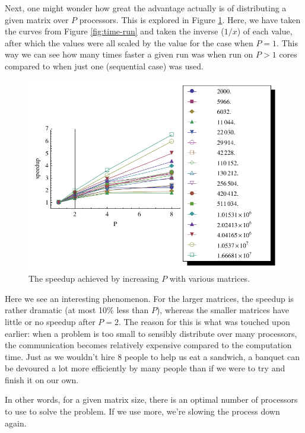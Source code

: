 \documentclass[a4paper]{article}
\newcommand{\legendplotsize}{1.3\textwidth}
\begin{document}
Next, one might wonder how great the advantage actually is of distributing a given matrix over $P$ processors.
This is explored in Figure \ref{fig:speedup}. Here, we have taken the curves from Figure \ref{fig:time-run} and
taken the inverse ($1/x$) of each value, after which the values were all scaled by the value for the case
when $P=1$. This way we can see how many times faster a given run was when run on $P>1$ cores compared to
when just one (sequential case) was used.




\begin{figure}[h]
    \begin{center}
        \includegraphics[width=\legendplotsize]{img/speedup.pdf}
    \end{center}
    \caption{The speedup achieved by increasing $P$ with various matrices.}
    \label{fig:speedup}
\end{figure}


Here we see an interesting phenomenon. For the larger matrices, the speedup is rather dramatic
(at most 10\% less than $P$), whereas the smaller matrices have little or no speedup after $P=2$. The
reason for this is what was touched upon earlier: when a problem is too small to sensibly distribute over
many processors, the communication becomes relatively expensive compared to the computation time. Just as we
wouldn't hire 8 people to help us eat a sandwich, a banquet can be devoured a lot more efficiently by many
people than if we were to try and finish it on our own.

In other words, for a given matrix size, there is an optimal number of processors to use
to solve the problem. If we use more, we're slowing the process down again.
\end{document}
